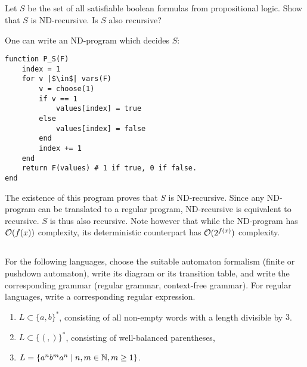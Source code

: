 \subsection{} %
Let \(S\) be the set of all satisfiable boolean formulas
from propositional logic.
Show that \(S\) is ND-recursive.
Is \(S\) also recursive?

\begin{solution}
One can write an ND-program which decides \(S\):
\begin{verbatim}
function P_S(F)
	index = 1
	for v |$\in$| vars(F)
		v = choose(1)
		if v == 1
			values[index] = true
		else
			values[index] = false
		end
		index += 1
	end
	return F(values) # 1 if true, 0 if false.
end
\end{verbatim}
The existence of this program proves that \(S\) is ND-recursive.
Since any ND-program can be translated to a regular program,
ND-recursive is equivalent to recursive.
\(S\) is thus also recursive.
Note however that while the ND-program has \(\mathcal{O}(f(x))\) complexity,
its deterministic counterpart has \(\mathcal{O}(2^{f(x)})\) complexity.
\end{solution}

\subsection{} %
For the following languages, choose the suitable automaton formalism
(finite or pushdown automaton),
write its diagram or its transition table,
and write the corresponding grammar
(regular grammar, context-free grammar).
For regular languages, write a corresponding regular expression.
\begin{enumerate}
	\item \(L \subset \{a, b\}^*\),
	consisting of all non-empty words with a length divisible by \(3\).
	\item \(L \subset \{(,)\}^*\),
	consisting of well-balanced parentheses,
	\item \(L = \{a^n b^m a^n \mid n, m \in \mathbb{N}, m \ge 1\}\).
\end{enumerate}

